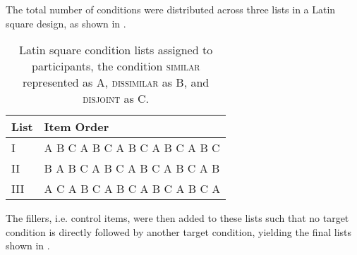 The total number of conditions were distributed across three lists in a Latin square design, as shown in . 
\begin{table}[!htb]
    \caption{Latin square condition lists assigned to participants, the condition {\scshape similar} represented as A, {\scshape dissimilar} as B, and {\scshape disjoint} as C.}
    \label{list-nofillers}
    \begin{tabular}{ll}\toprule
        List & Item Order\\\midrule
        I & A B C A B C A B C A B C A B C\\
        II & B A B C A B C A B C A B C A B\\
        III & A C A B C A B C A B C A B C A\\
        \bottomrule
    \end{tabular}
\end{table}
The fillers, i.e. control items, were then added to these lists such that no target condition is directly followed by another target condition, yielding the final lists shown in .
\begin{table}[!htb]
    \caption{Latin square condition lists assigned to participants, target conditions in boldface and fillers represented as {\scshape f}, the {\scshape similar} condition as A, {\scshape dissimilar} as B, and {\scshape disjoint} as C.}
\end{table}



